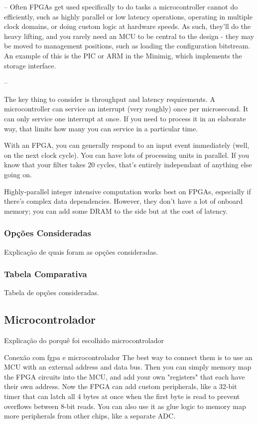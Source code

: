 	--
	Often FPGAs get used specifically to do tasks a microcontroller cannot do efficiently, such as highly parallel or low latency operations, operating in multiple clock domains, or doing custom logic at hardware speeds. As such, they'll do the heavy lifting, and you rarely need an MCU to be central to the design - they may be moved to management positions, such as loading the configuration bitstream. An example of this is the PIC or ARM in the Minimig, which implements the storage interface.
	
	--
	
	The key thing to consider is throughput and latency requirements. A microcontroller can service an interrupt (very roughly) once per microsecond. It can only service one interrupt at once. If you need to process it in an elaborate way, that limits how many you can service in a particular time.
	
	With an FPGA, you can generally respond to an input event immediately (well, on the next clock cycle). You can have lots of processing units in parallel. If you know that your filter takes 20 cycles, that's entirely independant of anything else going on.
	
	Highly-parallel integer intensive computation works best on FPGAs, especially if there's complex data dependencies. However, they don't have a lot of onboard memory; you can add some DRAM to the side but at the cost of latency.
	
	\subsubsection{Opções Consideradas}\label{fpga-options}
	
	Explicação de quais foram as opções consideradas.
	
	\subsubsection{Tabela Comparativa}\label{fpga-table}
	
	Tabela de opções consideradas.
	
	\subsection{Microcontrolador}\label{hard-uc}
	
	Explicação do porquê foi escolhido microcontrolador
	
	Conexão com fgpa e microcontrolador
	The best way to connect them is to use an MCU with an external address and data bus. Then you can simply memory map the FPGA circuits into the MCU, and add your own "registers" that each have their own address. Now the FPGA can add custom peripherals, like a 32-bit timer that can latch all 4 bytes at once when the first byte is read to prevent overflows between 8-bit reads. You can also use it as glue logic to memory map more peripherals from other chips, like a separate ADC.
	
